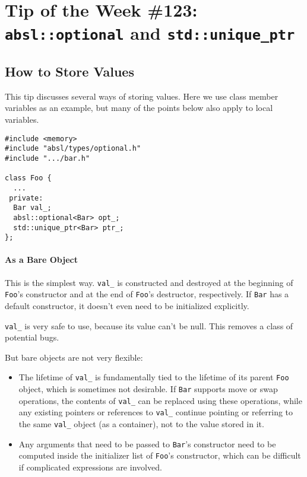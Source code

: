 
\chapter{Tip of the Week \#123: \texorpdfstring{\texttt{absl::optional} and \texttt{std::unique_ptr}}{}}\label{ch:tip-of-the-week-123}

\section{How to Store Values}\label{sec:how-to-store-values}
This tip discusses several ways of storing values. Here we use class member variables as an example, but many of the points below also apply to local variables.

\begin{verbatim}
#include <memory>
#include "absl/types/optional.h"
#include ".../bar.h"

class Foo {
  ...
 private:
  Bar val_;
  absl::optional<Bar> opt_;
  std::unique_ptr<Bar> ptr_;
};
\end{verbatim}

\subsubsection{As a Bare Object}
This is the simplest way. \texttt{val_} is constructed and destroyed at the beginning of \texttt{Foo}’s constructor and at the end of \texttt{Foo}’s destructor, respectively. If \texttt{Bar} has a default constructor, it doesn’t even need to be initialized explicitly.

\texttt{val_} is very safe to use, because its value can’t be null. This removes a class of potential bugs.

But bare objects are not very flexible:
\begin{itemize}
    \item The lifetime of \texttt{val_} is fundamentally tied to the lifetime of its parent \texttt{Foo} object, which is sometimes not desirable. If \texttt{Bar} supports move or swap operations, the contents of \texttt{val_} can be replaced using these operations, while any existing pointers or references to \texttt{val_} continue pointing or referring to the same \texttt{val_} object (as a container), not to the value stored in it.
    \item Any arguments that need to be passed to \texttt{Bar}’s constructor need to be computed inside the initializer list of \texttt{Foo}’s constructor, which can be difficult if complicated expressions are involved.
\end{itemize}

